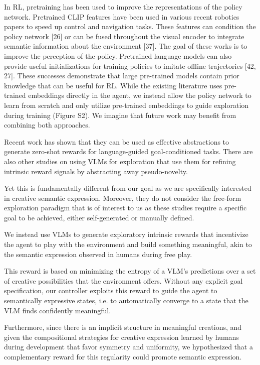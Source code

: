 In RL, pretraining has been used to improve the representations of the policy network. 
Pretrained CLIP features have been used in various recent robotics papers to speed up control and navigation tasks.
These features can condition the policy network [26] or can be fused throughout the visual encoder to integrate semantic information about the environment [37]. 
The goal of these works is to improve the perception of the policy.
Pretrained language models can also provide useful initializations for training policies to imitate offline trajectories [42, 27].
These successes demonstrate that large pre-trained models contain prior knowledge that can be useful for RL. While the existing literature uses pre-trained embeddings directly in the agent, we instead allow the policy network to learn from scratch and only utilize pre-trained embeddings to guide exploration during training (Figure S2).
We imagine that future work may benefit from combining both approaches.

Recent work \citep{zest,negprompt,vlmrm,lamp} has shown that they can be used as effective abstractions to generate zero-shot rewards for language-guided goal-conditioned tasks.
There are also other studies on using VLMs for exploration \citep{vlmlang,vlmdistill} that use them for refining intrinsic reward signals by abstracting away pseudo-novelty. 

Yet this is fundamentally different from our goal as we are specifically interested in creative semantic expression.
Moreover, they do not consider the free-form exploration paradigm that is of interest to us as these studies require a specific goal to be achieved, either self-generated or manually defined.

We instead use VLMs to generate exploratory intrinsic rewards that incentivize the agent to play with the environment and build something meaningful, akin to the semantic expression observed in humans during free play.

This reward is based on minimizing the entropy of a VLM's predictions over a set of creative possibilities that the environment offers.
Without any explicit goal specification, our controller exploits this reward to guide the agent to semantically expressive states, i.e. to automatically converge to a state that the VLM finds confidently meaningful.


Furthermore, since there is an implicit structure in meaningful creations, and given the compositional strategies for creative expression learned by humans during development \citep{symmetry,compositional} that favor symmetry and uniformity, we hypothesized that a complementary reward for this regularity \citep{rair} could promote semantic expression.

